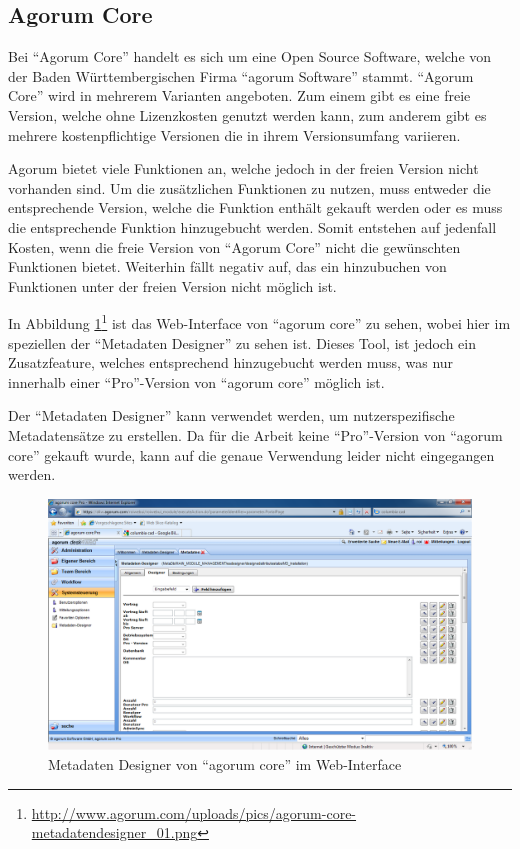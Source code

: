 \subsection{Agorum Core} \label{Agorum Core}
Bei "`Agorum Core"' handelt es sich um eine Open Source Software, welche von der Baden W\"urttembergischen Firma "`agorum Software"' stammt. "`Agorum Core"' wird in mehrerem Varianten angeboten. Zum einem gibt es eine freie Version, welche ohne Lizenzkosten genutzt werden kann, zum anderem gibt es mehrere kostenpflichtige Versionen die in ihrem Versionsumfang variieren. \cite{agorum_home} 

Agorum bietet viele Funktionen an, welche jedoch in der freien Version nicht vorhanden sind. Um die zus\"atzlichen Funktionen zu nutzen, muss entweder die entsprechende Version, welche die Funktion enth\"alt gekauft werden oder es muss die entsprechende Funktion hinzugebucht werden.
Somit entstehen auf jedenfall Kosten, wenn die freie Version von "`Agorum Core"' nicht die gew\"unschten Funktionen bietet. Weiterhin f\"allt negativ auf, das ein hinzubuchen von Funktionen unter der freien Version nicht m\"oglich ist. \cite{agorum_preise} \cite{Eval_DMS_Bachelor}

In Abbildung \ref{metadatendesigner agorum}\footnote{\url{http://www.agorum.com/uploads/pics/agorum-core-metadatendesigner_01.png}} ist das Web-Interface von "`agorum core"' zu sehen, wobei hier im speziellen der "`Metadaten Designer"' zu sehen ist. Dieses Tool, ist jedoch ein Zusatzfeature, welches entsprechend hinzugebucht werden muss, was nur innerhalb einer "`Pro"'-Version von "`agorum core"' m\"oglich ist. \cite{agorum_metadesigner_bild}

Der "`Metadaten Designer"' kann verwendet werden, um nutzerspezifische Metadatens\"atze zu erstellen.  Da f\"ur die Arbeit keine "`Pro"'-Version von "`agorum core"' gekauft wurde, kann auf die genaue Verwendung leider nicht eingegangen werden. \cite{agorum_metadaten_designer_video}

\begin{figure}[!ht]
\centering
\includegraphics[width=16cm]{Bilder/agorum-core-metadatendesigner.png}
\caption{Metadaten Designer von "`agorum core"' im Web-Interface}
\label{metadatendesigner agorum}
\centering
\end{figure}

